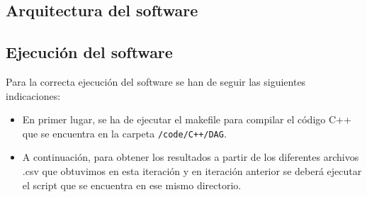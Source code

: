 \subsection{Arquitectura del software}

\subsection{Ejecución del software}
Para la correcta ejecución del software se han de seguir las siguientes indicaciones:
\begin{itemize}
\item En primer lugar, se ha de ejecutar el makefile para compilar el código C++ que se encuentra en la carpeta \texttt{/code/C++/DAG}.
\item A continuación, para obtener los resultados a partir de los diferentes archivos .csv que obtuvimos en esta iteración y en iteración anterior se deberá ejecutar el script que se encuentra en ese mismo directorio.
\end{itemize}